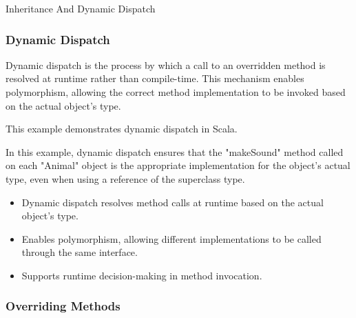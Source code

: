 \begin{notes}{Inheritance And Dynamic Dispatch}
    \subsubsection*{Dynamic Dispatch}
    
    Dynamic dispatch is the process by which a call to an overridden method is resolved at runtime rather than compile-time. This mechanism enables polymorphism, allowing the correct method implementation to be invoked based on the actual object's type.
    
    \begin{highlight}
    
        This example demonstrates dynamic dispatch in Scala.
    
    
        In this example, dynamic dispatch ensures that the "makeSound" method called on each "Animal" object is the appropriate implementation for the object's actual type, even when using a reference of the superclass type.
    
        \begin{itemize}
            \item Dynamic dispatch resolves method calls at runtime based on the actual object's type.
            \item Enables polymorphism, allowing different implementations to be called through the same interface.
            \item Supports runtime decision-making in method invocation.
        \end{itemize}
    
    \end{highlight}
    
    \subsubsection*{Overriding Methods}
    

\end{notes}
